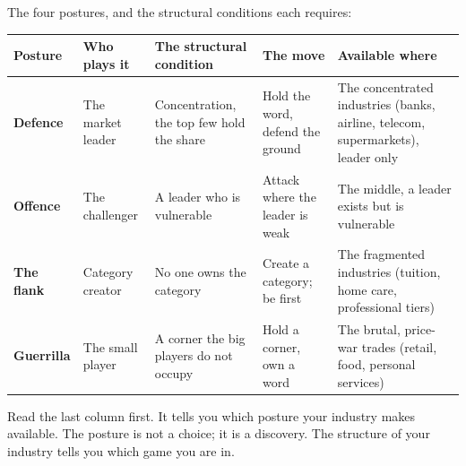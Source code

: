 \documentclass[10pt,twoside,openany]{memoir}
\renewcommand{\arraystretch}{1.1}
\begin{document}
{{{The four postures, and the structural conditions each requires:

{\def\LTcaptype{none} %
{\renewcommand{\arraystretch}{0.9}\begin{longtable}[]{@{}
  >{\raggedright\arraybackslash}p{}
  >{\raggedright\arraybackslash}p{}
  >{\raggedright\arraybackslash}p{}
  >{\raggedright\arraybackslash}p{}
  >{\raggedright\arraybackslash}p{}@{}}
\toprule\noalign{}
\begin{minipage}[b]{\linewidth}\raggedright
Posture
\end{minipage} & \begin{minipage}[b]{\linewidth}\raggedright
Who plays it
\end{minipage} & \begin{minipage}[b]{\linewidth}\raggedright
The structural condition
\end{minipage} & \begin{minipage}[b]{\linewidth}\raggedright
The move
\end{minipage} & \begin{minipage}[b]{\linewidth}\raggedright
Available where
\end{minipage} \\
\midrule\noalign{}
\endhead
\bottomrule\noalign{}
\endlastfoot
\textbf{Defence} & The market leader & Concentration, the top few hold
the share & Hold the word, defend the ground & The concentrated
industries (banks, airline, telecom, supermarkets), leader only \\
\textbf{Offence} & The challenger & A leader who is vulnerable & Attack
where the leader is weak & The middle, a leader exists but is
vulnerable \\
\textbf{The flank} & Category creator & No one owns the category &
Create a category; be first & The fragmented industries (tuition, home
care, professional tiers) \\
\textbf{Guerrilla} & The small player & A corner the big players do not
occupy & Hold a corner, own a word & The brutal, price-war trades
(retail, food, personal services) \\
\end{longtable}
}

Read the last column first. It tells you which posture your industry
makes available. The posture is not a choice; it is a discovery. The
structure of your industry tells you which game you are in.

}}}}
\end{document}
